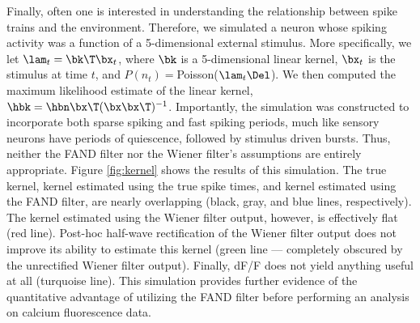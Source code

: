 % 
% 
% 

Finally, often one is interested in understanding the relationship between spike trains and the environment.  Therefore, we simulated a neuron whose spiking activity was a function of a 5-dimensional external stimulus.  More specifically, we let $\lam_t = \bk\T \bx_t$, where $\bk$ is a 5-dimensional linear kernel, $\bx_t$ is the stimulus at time $t$, and $P(n_t)=$Poisson($\lam_t \Del$).  We then computed the maximum likelihood estimate of the linear kernel, $\hbk=\hbn \bx\T (\bx \bx\T)^{-1}$.  Importantly, the simulation was constructed to incorporate both sparse spiking and fast spiking periods, much like sensory neurons have periods of quiescence, followed by stimulus driven bursts.  Thus, neither the FAND filter nor the Wiener filter's assumptions are entirely appropriate. Figure \ref{fig:kernel} shows the results of this simulation.  The true kernel, kernel estimated using the true spike times, and kernel estimated using the FAND filter, are nearly overlapping (black, gray, and blue lines, respectively).  The kernel estimated using the Wiener filter output, however, is effectively flat (red line). Post-hoc half-wave rectification of the Wiener filter output does not improve its ability to estimate this kernel (green line --- completely obscured by the unrectified Wiener filter output).  Finally, dF/F does not yield anything useful at all (turquoise line).  This simulation provides further evidence of the quantitative advantage of utilizing the FAND filter before performing an analysis on calcium fluorescence data.

